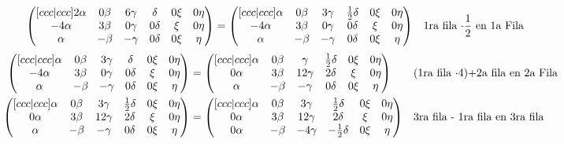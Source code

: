 \documentclass[letterpaper]{article}
\renewcommand{\*}{\cdot}
\theoremstyle{definition}
\begin{document}
		\begin{align*}
			 \begin{pmatrix}[ccc|ccc]
			 2\alpha & 0\beta & 6\gamma & \delta & 0\xi & 0\eta\\
			 -4\alpha & 3\beta & 0\gamma& 0\delta & \xi & 0\eta\\
			 \alpha & -\beta & -\gamma & 0\delta & 0\xi & \eta
			 \end{pmatrix} &= \begin{pmatrix}[ccc|ccc]
			 \alpha & 0\beta & 3\gamma & \frac{1}{2}\delta & 0\xi & 0\eta\\
			 -4\alpha & 3\beta & 0\gamma& 0\delta & \xi & 0\eta\\
			 \alpha & -\beta & -\gamma & 0\delta & 0\xi & \eta
			 \end{pmatrix}		  && \text{1ra fila $ \* \dfrac{1}{2}$ en 1a Fila } 
		\end{align*}
		\begin{align*}
			\begin{pmatrix}[ccc|ccc]
			\alpha & 0\beta & 3\gamma & \delta & 0\xi & 0\eta\\
			-4\alpha & 3\beta & 0\gamma& 0\delta & \xi & 0\eta\\
			\alpha & -\beta & -\gamma & 0\delta & 0\xi & \eta
			\end{pmatrix} &= \begin{pmatrix}[ccc|ccc]
			\alpha & 0\beta & \gamma & \frac{1}{2}\delta & 0\xi & 0\eta\\
			0\alpha & 3\beta & 12\gamma& 2\delta & \xi & 0\eta\\
			\alpha & -\beta & -\gamma & 0\delta & 0\xi & \eta
			\end{pmatrix}		  && \text{(1ra fila $ \* 4$)+2a fila en 2a Fila } \\  \begin{pmatrix}[ccc|ccc]
			\alpha & 0\beta & 3\gamma & \frac{1}{2}\delta & 0\xi & 0\eta\\
			0\alpha & 3\beta & 12\gamma& 2\delta & \xi & 0\eta\\
			\alpha & -\beta & -\gamma & 0\delta & 0\xi & \eta
			\end{pmatrix} &=  \begin{pmatrix}[ccc|ccc]
			\alpha & 0\beta & 3\gamma & \frac{1}{2}\delta & 0\xi & 0\eta\\
			0\alpha & 3\beta & 12\gamma& 2\delta & \xi & 0\eta\\
			0\alpha & -\beta & -4\gamma & -\frac{1}{2}\delta & 0\xi & \eta
			\end{pmatrix} && \text{3ra fila - 1ra fila en 3ra fila}
		\end{align*}
\end{document}
